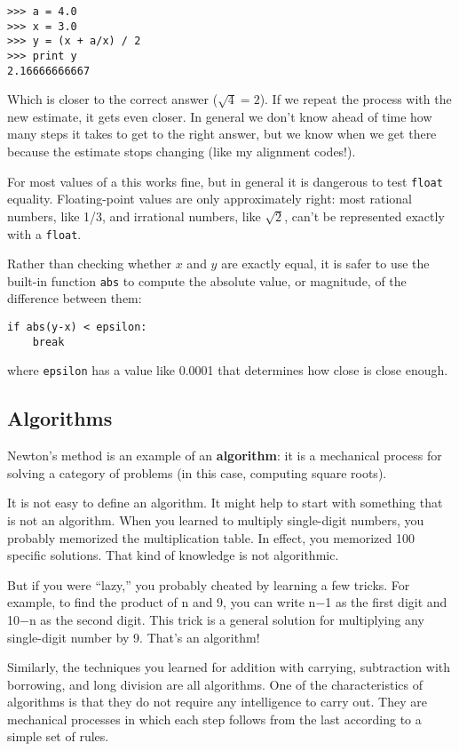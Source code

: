 \documentclass{article}
\begin{document}
\begin{lstlisting}
>>> a = 4.0
>>> x = 3.0
>>> y = (x + a/x) / 2
>>> print y
2.16666666667
\end{lstlisting}
Which is closer to the correct answer ($\sqrt{4} = 2$). If we repeat the
process with the new estimate, it gets even closer.
In general we don’t know ahead of time how many steps it takes to get to
the right answer, but we know when we get there because the estimate stops
changing (\textcolor{bred}{like my alignment codes!}).

For most values of a this works fine, but in general it is dangerous to
test \verb|float| equality. Floating-point values are only approximately right:
most rational numbers, like 1/3, and irrational numbers, like $\sqrt{2}$, can’t be
represented exactly with a \verb|float|.

Rather than checking whether $x$ and $y$ are exactly equal, it is safer to use
the built-in function \verb|abs| to compute the absolute value, or magnitude, of
the difference between them:
\begin{lstlisting}
if abs(y-x) < epsilon:
    break
\end{lstlisting}
where \verb|epsilon| has a value like 0.0001 that determines how close is
close enough.

\subsection{Algorithms}
Newton’s method is an example of an \textbf{algorithm}: it is a mechanical process
for solving a category of problems (in this case, computing square roots).

It is not easy to define an algorithm. It might help to start with
something that is not an algorithm. When you learned to multiply
single-digit numbers, you probably memorized the multiplication table. In
effect, you memorized 100 specific solutions. That kind of knowledge is not
algorithmic.

But if you were ``lazy,'' you probably cheated by learning a few tricks. For
example, to find the product of n and 9, you can write n−1 as the first
digit and 10−n as the second digit. This trick is a general solution for
multiplying any single-digit number by 9. That’s an algorithm!

Similarly, the techniques you learned for addition with carrying,
subtraction with borrowing, and long division are all algorithms. One of
the characteristics of algorithms is that they do not require any
intelligence to carry out. They are mechanical processes in which each step
follows from the last according to a simple set of rules.
\end{document}
